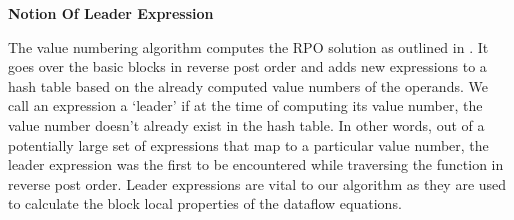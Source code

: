 \documentclass[10pt,twoside]{report}
\begin{document}
\begin{flushleft}
\textbf{\large{Notion Of Leader Expression}}
\end{flushleft}
The value numbering algorithm computes the RPO solution as outlined in
\cite{Cooper95scc-basedvalue}. It goes over the basic blocks in reverse post
order and adds new expressions to a hash table based on the already computed
value numbers of the operands. We call an expression a `leader' if at the time
of computing its value number, the value number doesn't already exist in the
hash table. In other words, out of a potentially large set of expressions that
map to a particular value number, the leader expression was the first to be
encountered while traversing the function in reverse post order. Leader
expressions are vital to our algorithm as they are used to calculate the block
local properties of the dataflow equations.
\end{document}
